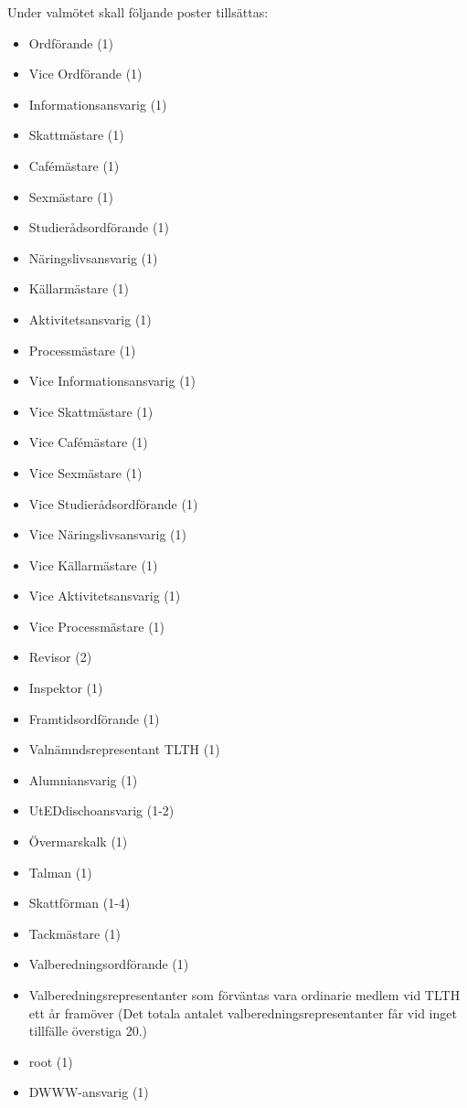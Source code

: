 \documentclass[pdfbookmarks,a4paper,11pt]{article}
\newlength{\itemcollength}
\newenvironment{reglemlista}{%
  \begin{list}{}{%
      \setlength{\labelwidth}{\itemcollength}%
      \setlength{\leftmargin}{\labelwidth + \labelsep}%
      \renewcommand{\makelabel}[1]{%
        \raisebox{0pt}[1ex][0pt]{%
          \makebox[\labelwidth][l]{%
            \parbox[t]{\itemcollength}{%
              \raggedright\hspace{0pt}##1}}}\hfill}%
      }}{%
  \end{list}}
\begin{document}
\begin{reglemlista}
	\item[Valmöte]
	Under valmötet skall följande poster tillsättas:
	\begin{itemize}
		\item Ordförande (1)
		\item Vice Ordförande (1)
		\item Informationsansvarig (1)
		\item Skattmästare (1)
		\item Cafémästare (1)
		\item Sexmästare (1)
		\item Studierådsordförande (1)
		\item Näringslivsansvarig (1)
		\item Källarmästare (1)
		\item Aktivitetsansvarig (1)
        \item Processmästare (1)
		\item Vice Informationsansvarig (1)
		\item Vice Skattmästare (1)
		\item Vice Cafémästare (1)
		\item Vice Sexmästare (1)
		\item Vice Studierådsordförande (1)
		\item Vice Näringslivsansvarig (1)
		\item Vice Källarmästare (1)
		\item Vice Aktivitetsansvarig (1)
        \item Vice Processmästare (1)
		\item Revisor (2)
		\item Inspektor (1)
		\item Framtidsordförande (1)
		\item Valnämndsrepresentant TLTH (1)
		\item Alumniansvarig (1)
		\item UtEDdischoansvarig (1-2)
		\item Övermarskalk (1)
		\item Talman (1)
		\item Skattförman (1-4)
		\item Tackmästare (1)
	\end{itemize}

	\item[Höstterminsmöte Två]
	\begin{itemize}
		\item Valberedningsordförande (1)
		\item  Valberedningsrepresentanter som förväntas vara ordinarie medlem vid TLTH ett år framöver (Det totala antalet valberedningsrepresentanter får vid inget tillfälle överstiga 20.)
		\item root (1)
		\item DWWW-ansvarig (1)
	\end{itemize}
\end{reglemlista}
\end{document}
